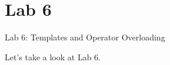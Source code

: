 \documentclass[14pt,aspectratio=1610, hyperref={pdfpagelayout=SinglePage}]{beamer}
\begin{document}
\section*{Lab 6}
\begin{frame}{Lab 6: Templates and Operator Overloading}
\begin{center}\Large
Let's take a look at Lab 6.
\end{center}
\end{frame}
\end{document}
